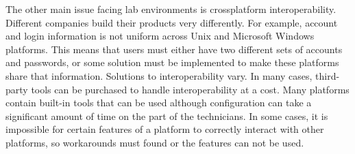 The other main issue facing lab environments is crossplatform interoperability.  Different companies build their products very differently.  For example, account and login information is not uniform across Unix and Microsoft Windows platforms.  This means that users must either have two different sets of accounts and passwords, or some solution must be implemented to make these platforms share that information.   Solutions to interoperability vary.  In many cases, third-party tools can be purchased to handle interoperability at a cost.  Many platforms contain built-in tools that can be used although configuration can take a significant amount of time on the part of the technicians.  In some cases, it is impossible for certain features of a platform to correctly interact with other platforms, so workarounds must found or the features can not be used. 





